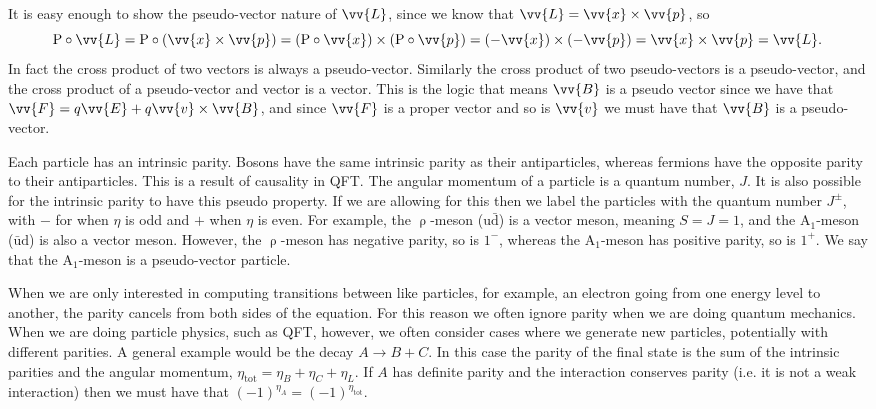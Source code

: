 \documentclass[fleqn]{NotesClass}
\newcommand*{\Psym}{\mathrm{P}}
\begin{document}
    It is easy enough to show the pseudo-vector nature of \(\vv{L}\), since we know that \(\vv{L} = \vv{x} \times \vv{p}\), so
    \begin{equation}
        \Psym\circ \vv{L} = \Psym \circ (\vv{x} \times \vv{p}) = (\Psym\circ\vv{x})\times(\Psym\circ\vv{p}) = (-\vv{x}) \times (-\vv{p}) = \vv{x} \times \vv{p} = \vv{L}.
    \end{equation}
    In fact the cross product of two vectors is always a pseudo-vector.
    Similarly the cross product of two pseudo-vectors is a pseudo-vector, and the cross product of a pseudo-vector and vector is a vector.
    This is the logic that means \(\vv{B}\) is a pseudo vector since we have that \(\vv{F} = q\vv{E} + q\vv{v}\times\vv{B}\), and since \(\vv{F}\) is a proper vector and so is \(\vv{v}\) we must have that \(\vv{B}\) is a pseudo-vector.
    
    Each particle has an intrinsic parity.
    Bosons have the same intrinsic parity as their antiparticles, whereas fermions have the opposite parity to their antiparticles.
    This is a result of causality in QFT.
    The angular momentum of a particle is a quantum number, \(J\).
    It is also possible for the intrinsic parity to have this pseudo property.
    If we are allowing for this then we label the particles with the quantum number \(J^\pm\), with \(-\) for when \(\eta\) is odd and \(+\) when \(\eta\) is even.
    For example, the \(\uprho\)-meson (\(\mathrm{u}\bar{\mathrm{d}}\)) is a vector meson, meaning \(S = J = 1\), and the \(\mathrm{A}_1\)-meson (\(\bar{\mathrm{u}}\mathrm{d}\)) is also a vector meson.
    However, the \(\uprho\)-meson has negative parity, so is \(1^{-}\), whereas the \(\mathrm{A}_1\)-meson has positive parity, so is \(1^{+}\).
    We say that the \(\mathrm{A}_1\)-meson is a pseudo-vector particle.
    
    When we are only interested in computing transitions between like particles, for example, an electron going from one energy level to another, the parity cancels from both sides of the equation.
    For this reason we often ignore parity when we are doing quantum mechanics.
    When we are doing particle physics, such as QFT, however, we often consider cases where we generate new particles, potentially with different parities.
    A general example would be the decay \(A \to B + C\).
    In this case the parity of the final state is the sum of the intrinsic parities and the angular momentum, \(\eta_{\mathrm{tot}} = \eta_B + \eta_C + \eta_L\).
    If \(A\) has definite parity and the interaction conserves parity (i.e. it is not a weak interaction) then we must have that \((-1)^{\eta_A} = (-1)^{\eta_{\mathrm{tot}}}\).
    
\end{document}
